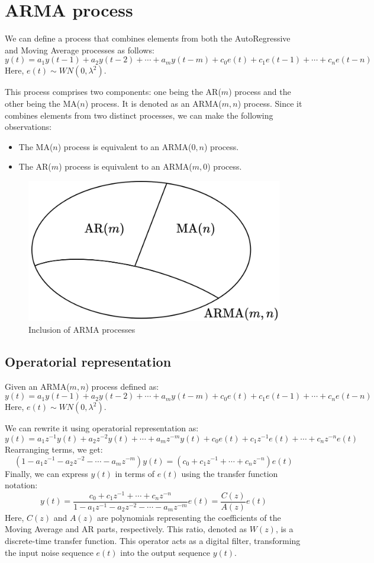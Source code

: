 \section{ARMA process}

We can define a process that combines elements from both the AutoRegressive and Moving Average processes as follows:
\[y(t)=a_1y(t-1)+a_2y(t-2)+\cdots+a_m y(t-m)+c_0e(t)+c_1e(t-1)+\cdots+c_n e(t-n) \]
Here, $e(t)\sim WN(0,\lambda^2)$.

This process comprises two components: one being the AR($m$) process and the other being the MA($n$) process. 
It is denoted as an ARMA($m,n$) process.
Since it combines elements from two distinct processes, we can make the following observations:
\begin{itemize}
    \item The MA($n$) process is equivalent to an ARMA($0,n$) process.
    \item The AR($m$) process is equivalent to an ARMA($m,0$) process. 
\end{itemize}
\begin{figure}[H]
    \centering
    \includegraphics[width=0.45\linewidth]{images/set.png}
    \caption{Inclusion of ARMA processes}
\end{figure}

\subsection{Operatorial representation}
Given an ARMA($m,n$) process defined as:
\[y(t)=a_1y(t-1)+a_2y(t-2)+\cdots+a_m y(t-m)+c_0e(t)+c_1e(t-1)+\cdots+c_n e(t-n)\]
Here, $e(t)\sim WN(0,\lambda^2)$.

We can rewrite it using operatorial representation as:
\[y(t)=a_1z^{-1}y(t)+a_2z^{-2}y(t)+\cdots+a_m z^{-m}y(t)+c_0e(t)+c_1z^{-1}e(t)+\cdots+c_n z^{-n}e(t)\]
Rearranging terms, we get:
\[\left(1- a_1z^{-1}-a_2z^{-2}-\cdots-a_m z^{-m}\right)y(t)=\left(c_0+c_1z^{-1}+\cdots+c_n z^{-n}\right)e(t)\]
Finally, we can express $y(t)$ in terms of $e(t)$ using the transfer function notation:
\[y(t)=\dfrac{c_0+c_1z^{-1}+\cdots+c_n z^{-n}}{1- a_1z^{-1}-a_2z^{-2}-\cdots-a_m z^{-m}}e(t)=\dfrac{C(z)}{A(z)}e(t)\]
Here, $C(z)$ and $A(z)$ are polynomials representing the coefficients of the Moving Average and AR parts, respectively. 
This ratio, denoted as $W(z)$, is a discrete-time transfer function. 
This operator acts as a digital filter, transforming the input noise sequence $e(t)$ into the output sequence $y(t)$.


